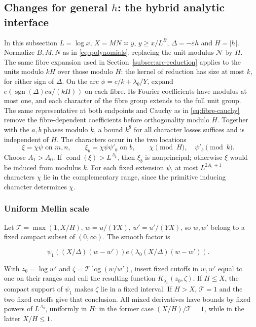 \documentclass[11pt]{article}
\theoremstyle{definition}
\DeclareMathOperator{\cond}{cond}
\newcommand{\GN}{\mathcal N}
\theoremstyle{remark}
\numberwithin{equation}{section}
\begin{document}
\subsection{Changes for general \texorpdfstring{$h$}{h}: the hybrid analytic interface}\label{subsec:hybrid}
In this subsection $L=\log x$, $X=MN\asymp y$, $y\ge x/L^B$,
$\Delta=-\varepsilon h$ and $H=|h|$. Normalize $B,M,N$ as in
\eqref{eq:polynomials}, replacing the unit modulus $\GN$ by $H$.
The same fibre expansion used in
Section~\ref{subsec:arc-reduction} applies to the units modulo
$kH$ over those modulo $H$: the kernel of reduction has size at
most $k$, for either sign of $\Delta$. On the arc
$\phi=c/k+\lambda_0/Y$, expand
$e(\operatorname{sgn}(\Delta)cu/(kH))$ on each fibre.
Its Fourier coefficients have modulus at most one, and each
character of the fibre group extends to the full unit group.
The same representative at both endpoints and Cauchy as in
\eqref{eq:fibre-cauchy} remove the fibre-dependent coefficients
before orthogonality modulo $H$. Together with the $a,b$
phases modulo $k$, a bound $k^8$ for all character losses
suffices and is independent of $H$.
The characters occur in the two locations
\begin{equation}\label{v2:5-3}
 \xi=\chi\psi\text{ on }m,n,\qquad
 \xi_b=\chi\psi\psi'_b\text{ on }b,\qquad
 \chi\pmod H,\quad\psi'_b\pmod k.
\end{equation}
Choose $A_1>A_0$. If $\cond(\xi)>L^{A_1}$, then
$\xi_b$ is nonprincipal; otherwise $\xi$ would be induced from
modulus $k$. For each fixed extension $\psi$, at most
$L^{2A_1+1}$ characters $\chi$ lie in the complementary range,
since the primitive inducing character determines $\chi$.

\subsubsection{Uniform Mellin scale}
Let $\mathcal T=\max(1,X/H)$, $w=u/(YX)$, $w'=u'/(YX)$, so $w,w'$ belong to a fixed compact subset of $(0,\infty)$. The smooth factor is


\begin{equation}
\psi_1((X/\Delta)(w-w'))e(\lambda_0(X/\Delta)(w-w')).
\end{equation}


With $z_0=\log w'$ and $\zeta=\mathcal T\log(w/w')$, insert fixed cutoffs in $w,w'$ equal to one on their ranges and call the resulting function $K_{\lambda_0}(z_0,\zeta)$. If $H\le X$, the compact support of $\psi_1$ makes $\zeta$ lie in a fixed interval. If $H>X$, $\mathcal T=1$ and the two fixed cutoffs give that conclusion. All mixed derivatives have bounds by fixed powers of $L^{A_0}$, uniformly in $H$: in the former case $(X/H)/\mathcal T=1$, while in the latter $X/H\le1$.
\end{document}
